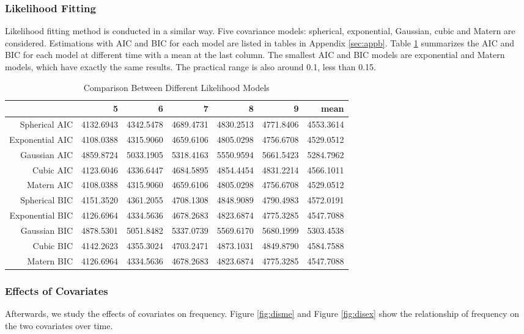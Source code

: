 \documentclass[hidelinks,12pt]{article}
\begin{document}
	\subsubsection{Likelihood Fitting}
	Likelihood fitting method is conducted in a similar way. Five covariance models: spherical, exponential, Gaussian, cubic and Matern are considered. Estimations with AIC and BIC for each model are listed in tables in Appendix \ref{sec:appb}. Table \ref{tbl:complik} summarizes the AIC and BIC for each model at different time with a mean at the last column. The smallest AIC and BIC models are exponential and Matern models, which have exactly the same results. The practical range is also around 0.1, less than 0.15.
	\begin{table}[ht]
		\centering
		\caption{Comparison Between Different Likelihood Models \label{tbl:complik}}
		\begin{tabular}{rrrrrrr}
			\hline
			& 5 & 6 & 7 & 8 & 9 & mean \\ 
			\hline
			Spherical AIC & 4132.6943 & 4342.5478 & 4689.4731 & 4830.2513 & 4771.8406 & 4553.3614 \\ 
			Exponential AIC & 4108.0388 & 4315.9060 & 4659.6106 & 4805.0298 & 4756.6708 & 4529.0512 \\ 
			Gaussian AIC & 4859.8724 & 5033.1905 & 5318.4163 & 5550.9594 & 5661.5423 & 5284.7962 \\ 
			Cubic AIC & 4123.6046 & 4336.6447 & 4684.5895 & 4854.4454 & 4831.2214 & 4566.1011 \\ 
			Matern AIC & 4108.0388 & 4315.9060 & 4659.6106 & 4805.0298 & 4756.6708 & 4529.0512 \\ 
			Spherical BIC & 4151.3520 & 4361.2055 & 4708.1308 & 4848.9089 & 4790.4983 & 4572.0191 \\ 
			Exponential BIC & 4126.6964 & 4334.5636 & 4678.2683 & 4823.6874 & 4775.3285 & 4547.7088 \\ 
			Gaussian BIC & 4878.5301 & 5051.8482 & 5337.0739 & 5569.6170 & 5680.1999 & 5303.4538 \\ 
			Cubic BIC & 4142.2623 & 4355.3024 & 4703.2471 & 4873.1031 & 4849.8790 & 4584.7588 \\ 
			Matern BIC & 4126.6964 & 4334.5636 & 4678.2683 & 4823.6874 & 4775.3285 & 4547.7088 \\ 
			\hline
		\end{tabular}
	\end{table}
	
	\subsubsection{Effects of Covariates}
	Afterwards, we study the effects of covariates on frequency. Figure \ref{fig:disme} and Figure \ref{fig:disex} show the relationship of frequency on the two covariates over time.
	
\end{document}
